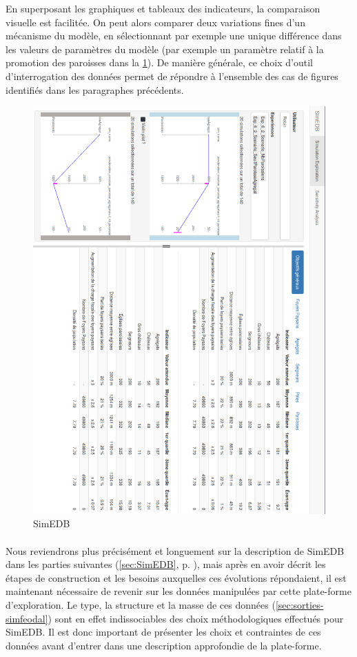 	En superposant les graphiques et tableaux des indicateurs, la comparaison visuelle est facilitée.
	On peut alors comparer deux variations fines d'un mécanisme du modèle, en sélectionnant par exemple une unique différence dans les valeurs de paramètres du modèle (par exemple un paramètre relatif à la promotion des paroisses dans la \cref{fig:simedb_villages}).
	De manière générale, ce choix d'outil d'interrogation des données permet de répondre à l'ensemble des cas de figures identifiés dans les paragraphes précédents.
	
	\begin{figure}[H]
		\centering
		\includegraphics[width=\linewidth]{img/SimEDB_base_rotate.png}
		\caption{SimEDB }
		\label{fig:simedb_villages}
	\end{figure}

	\paragraph*{}
	Nous reviendrons plus précisément et longuement sur la description de SimEDB dans les parties suivantes (\cref{sec:SimEDB}, p. \pageref{sec:SimEDB}), mais après en avoir décrit les étapes de construction et les besoins auxquelles ces évolutions répondaient, il est maintenant nécessaire de revenir sur les données manipulées par cette plate-forme d'exploration.
	Le type, la structure et la masse de ces données (\cref{sec:sorties-simfeodal}) sont en effet indissociables des choix méthodologiques effectués pour SimEDB.
	Il est donc important de présenter les choix et contraintes de ces données avant d'entrer dans une description approfondie de la plate-forme.
